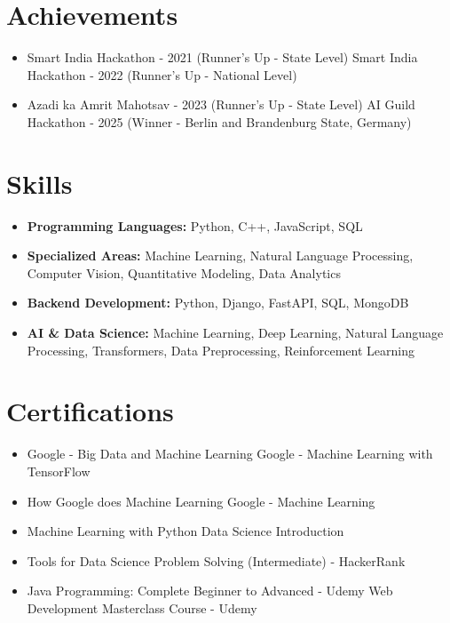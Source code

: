 \documentclass[a4paper,10pt]{article}
\begin{document}
\section*{Achievements}
\begin{itemize}
\item Smart India Hackathon - 2021 (Runner's Up - State Level) \hfill Smart India Hackathon - 2022 (Runner's Up - National Level)
\item Azadi ka Amrit Mahotsav - 2023 (Runner's Up - State Level) \hfill AI Guild Hackathon - 2025 (Winner - Berlin and Brandenburg State, Germany)
\end{itemize}

\section*{Skills}
\begin{itemize}
  \item \textbf{Programming Languages:} Python, C++, JavaScript, SQL
  \item \textbf{Specialized Areas:} Machine Learning, Natural Language Processing, Computer Vision, Quantitative Modeling, Data Analytics
  \item \textbf{Backend Development:} Python, Django, FastAPI, SQL, MongoDB
  \item \textbf{AI \& Data Science:} Machine Learning, Deep Learning, Natural Language Processing, Transformers, Data Preprocessing, Reinforcement Learning
\end{itemize}

\section*{Certifications}
\begin{itemize}
\item Google - Big Data and Machine Learning \hfill Google - Machine Learning with TensorFlow
\item How Google does Machine Learning \hfill Google - Machine Learning
\item Machine Learning with Python \hfill Data Science Introduction
\item Tools for Data Science \hfill Problem Solving (Intermediate) - HackerRank
\item Java Programming: Complete Beginner to Advanced - Udemy \hfill Web Development Masterclass Course - Udemy
\end{itemize}
\end{document}
